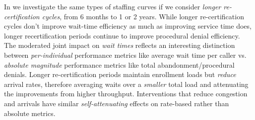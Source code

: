 \documentclass[manuscript,screen,authorversion]{acmart}
\begin{document}
In  we investigate the same types of staffing curves if we consider \textit{longer re-certification cycles}, from 6 months to 1 or 2 years. While longer re-certification cycles don't improve wait-time efficiency as much as improving service time does, longer recertification periods continue to improve procedural denial efficiency. The moderated joint impact on \textit{wait times} reflects an interesting distinction between \textit{per-individual} performance metrics like average wait time per caller vs. \textit{absolute magnitude} performance metrics like total abandonment/procedural denials. Longer re-certification periods maintain enrollment loads but \textit{reduce} arrival rates, therefore averaging waits over a \textit{smaller} total load and attenuating the improvements from higher throughput. Interventions that reduce {congestion and arrivals} have similar \textit{self-attenuating} effects on rate-based rather than absolute metrics.  
\end{document}
